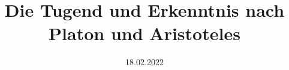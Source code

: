 

\subject{Essay}
\title{
  Die Tugend und Erkenntnis nach \\
  Platon und Aristoteles 
}
\date{18.02.2022}



\maketitle
\thispagestyle{empty}
\newpage






\newpage
\printbibliography{}


